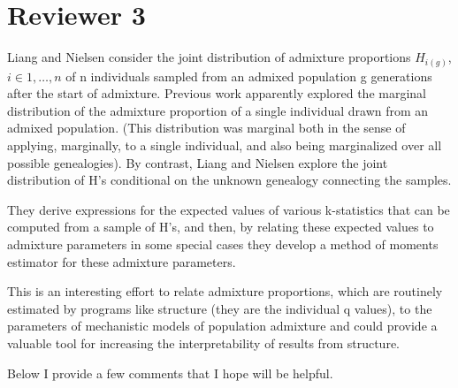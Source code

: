 \documentclass[11pt]{amsart}
\begin{document}
\section{Reviewer 3}
Liang and Nielsen consider the joint distribution of admixture proportions $H_{i(g)}$, $i\in 1,\ldots, n$ of
n individuals sampled from an admixed population g generations after the start of admixture. Previous
work apparently explored the marginal distribution of the admixture proportion of a single individual
drawn from an admixed population. (This distribution was marginal both in the sense of applying,
marginally, to a single individual, and also being marginalized over all possible genealogies). By contrast,
Liang and Nielsen explore the joint distribution of H's conditional on the unknown genealogy connecting
the samples.

They derive expressions for the expected values of various k-statistics that can be computed from a
sample of H's, and then, by relating these expected values to admixture parameters in some special cases
they develop a method of moments estimator for these admixture parameters.

This is an interesting effort to relate admixture proportions, which are routinely estimated by programs
like structure (they are the individual q values), to the parameters of mechanistic models of population
admixture and could provide a valuable tool for increasing the interpretability of results from structure.

Below I provide a few comments that I hope will be helpful.
\end{document}
